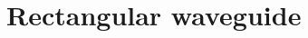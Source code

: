 \documentclass[12pt,twoside,english]{book}
\renewcommand{\~}{\perispomeni}%
\numberwithin{equation}{section}
\numberwithin{figure}{section}
\begin{document}
%
%
%
%
%
%

\section{Rectangular waveguide}
\end{document}
